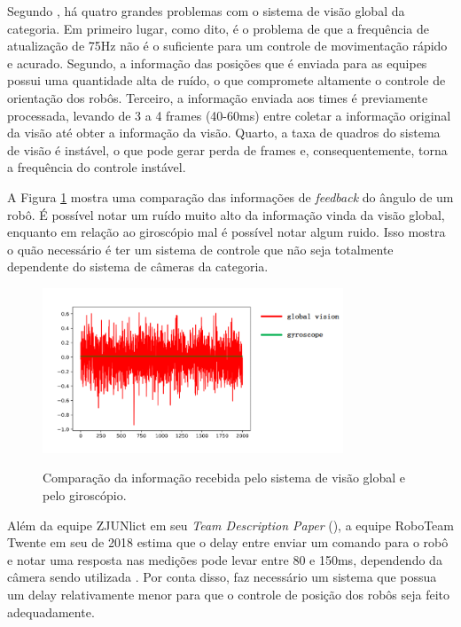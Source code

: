 \documentclass[acronym, symbols, table]{fei}
\begin{document}
			Segundo \textcite{tdpZJUNlict2020}, há quatro grandes problemas com o sistema de visão global da categoria. Em primeiro lugar, como dito, é o problema de que a frequência de atualização de 75Hz não é o suficiente para um controle de movimentação rápido e acurado. Segundo, a informação das posições que é enviada para as equipes possui uma quantidade alta de ruído, o que compromete altamente o controle de orientação dos robôs. Terceiro, a informação enviada aos times é previamente processada, levando de 3 a 4 frames (40-60ms) entre coletar a informação original da visão até obter a informação da visão. Quarto, a taxa de quadros do sistema de visão é instável, o que pode gerar perda de frames e, consequentemente, torna a frequência do controle instável.
			
			A Figura \ref{fig:comparison_cameras_gyroscope} mostra uma comparação das informações de \textit{feedback} do ângulo de um robô. É possível notar um ruído muito alto da informação vinda da visão global, enquanto em relação ao giroscópio mal é possível notar algum ruido. Isso mostra o quão necessário é ter um sistema de controle que não seja totalmente dependente do sistema de câmeras da categoria.
			
			\begin{figure}[!htb]
					\centering
					\caption{Comparação da informação recebida pelo sistema de visão global e pelo giroscópio.} 
					\includegraphics[width=0.8\textwidth]{Comparacao_cameras_giroscopio.png}
					\label{fig:comparison_cameras_gyroscope}
				\end{figure}
		
			Além da equipe ZJUNlict em seu \textit{Team Description Paper} (), a equipe RoboTeam Twente em seu  de 2018 estima que o delay entre enviar um comando para o robô e notar uma resposta nas medições pode levar entre 80 e 150ms, dependendo da câmera sendo utilizada \cite{tdptwente2018}. Por conta disso, faz necessário um sistema que possua um delay relativamente menor para que o controle de posição dos robôs seja feito adequadamente.
\end{document}
